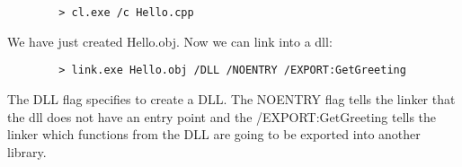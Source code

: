 \documentclass[../LabBook]{subfiles}
\begin{document}
    \begin{verbatim}
        > cl.exe /c Hello.cpp
    \end{verbatim}

    We have just created Hello.obj. Now we can link into a dll:

    \begin{verbatim}
        > link.exe Hello.obj /DLL /NOENTRY /EXPORT:GetGreeting
    \end{verbatim}

    The DLL flag specifies to create a DLL. The NOENTRY flag tells the linker that the dll
    does not have an entry point and the /EXPORT:GetGreeting tells the linker which functions from the DLL
    are going to be exported into another library.
\end{document}
